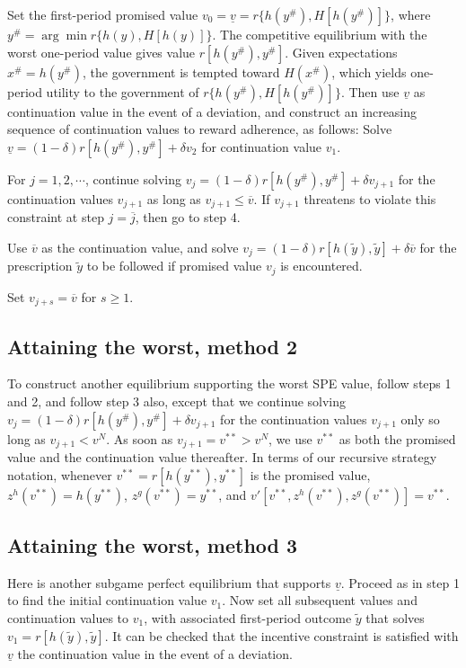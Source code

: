 \smallskip
{} Set the first-period promised value
$v_0 =\underline{v} = r \{ h(y^\#), H [h(y^\#)] \}$,
where $y^\# = \arg\min r\{ h(y),H [h(y)]\}$.
The competitive equilibrium with the worst one-period
value gives value
$r [h(y^\#), y^\#]$. Given expectations $x^\#=h(y^\#)$, the government
is tempted toward $H(x^\#)$, which yields one-period
utility to the government of
$r \{ h(y^\#), H [h(y^\#)]\}$.
Then use $\underline v$ as continuation value in the
event of a deviation, and construct an increasing sequence of
 continuation values to reward adherence, as follows:
\smallskip
{} Solve
$\underline{v} = (1-\delta) r [h(y^\#),y^\#] + \delta v_2$
for continuation value $v_1$.

\smallskip
{} For $j=1,2,\cdots$, continue solving
$v_j = (1-\delta) r[h(y^\#), y^\#] + \delta v_{j+1}$
for the continuation values $v_{j+1}$ as long as $v_{j+1} \leq \overline v$. If
$v_{j+1}$ threatens to violate this constraint at step $j =
\overline j$, then go to step 4.

\smallskip
{} Use $\overline v$ as the continuation value, and solve
$v_j = (1-\delta) r[h(\tilde y), \tilde y] + \delta \overline v$
for the prescription $\tilde y$ to be followed if promised value
$v_j$ is encountered.

\smallskip
{} Set $v_{j+s} = \overline v$ for $s\geq 1$.

\subsection{Attaining the worst, method 2}
To construct another equilibrium supporting
the worst SPE value, follow steps
1 and 2, and follow step 3 also, except that
we continue solving
$v_j = (1-\delta) r [ h(y^\#), y^\#] + \delta v_{j+1}$
for the continuation values $v_{j+1}$ only so long as $v_{j+1} <  v^N$.
As soon as $v_{j+1} = v^{**} > v^N$, we use $v^{**}$ as both the
promised value and
the continuation value thereafter.  In terms of our recursive
strategy notation, whenever $v^{**}
= r [h(y^{**}),y^{**}]$ is
the promised value, $z^h(v^{**})= h(y^{**})$, $z^g(v^{**})= y^{**}$,
and $v'[v^{**}, z^h(v^{**}), z^g(v^{**})]=v^{**}$.

\subsection{Attaining the worst, method 3}
Here is another subgame perfect equilibrium that supports $\underline v$.
Proceed as in step 1 to find the initial continuation value $v_1$.  Now
set all subsequent values and  continuation values to $v_1$,
with associated first-period outcome $\tilde y$ that solves
$v_1 = r [h(\tilde y),\tilde y]$.  It can be checked that the
incentive constraint is satisfied with $\underline v$ the
continuation value in the event of a deviation.


